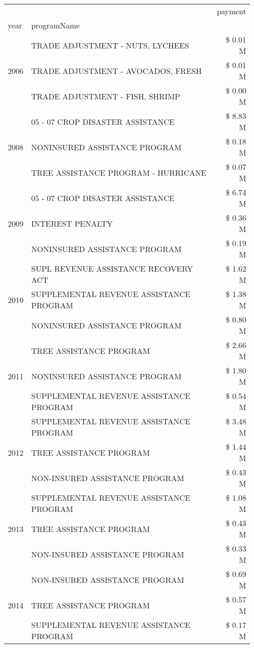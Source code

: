 \begin{tabular}{llr}
\toprule
 &  & payment \\
year & programName &  \\
\midrule
\multirow[t]{3}{*}{2006} & TRADE ADJUSTMENT - NUTS, LYCHEES & \$ 0.01 M \\
 & TRADE ADJUSTMENT - AVOCADOS, FRESH & \$ 0.01 M \\
 & TRADE ADJUSTMENT - FISH, SHRIMP & \$ 0.00 M \\
\cline{1-3}
\multirow[t]{3}{*}{2008} & 05 - 07 CROP DISASTER ASSISTANCE & \$ 8.83 M \\
 & NONINSURED ASSISTANCE PROGRAM & \$ 0.18 M \\
 & TREE ASSISTANCE PROGRAM - HURRICANE & \$ 0.07 M \\
\cline{1-3}
\multirow[t]{3}{*}{2009} & 05 - 07 CROP DISASTER ASSISTANCE & \$ 6.74 M \\
 & INTEREST PENALTY & \$ 0.36 M \\
 & NONINSURED ASSISTANCE PROGRAM & \$ 0.19 M \\
\cline{1-3}
\multirow[t]{3}{*}{2010} & SUPL REVENUE ASSISTANCE RECOVERY ACT & \$ 1.62 M \\
 & SUPPLEMENTAL REVENUE ASSISTANCE PROGRAM & \$ 1.38 M \\
 & NONINSURED ASSISTANCE PROGRAM & \$ 0.80 M \\
\cline{1-3}
\multirow[t]{3}{*}{2011} & TREE ASSISTANCE PROGRAM & \$ 2.66 M \\
 & NONINSURED ASSISTANCE PROGRAM & \$ 1.80 M \\
 & SUPPLEMENTAL REVENUE ASSISTANCE PROGRAM & \$ 0.54 M \\
\cline{1-3}
\multirow[t]{3}{*}{2012} & SUPPLEMENTAL REVENUE ASSISTANCE PROGRAM & \$ 3.48 M \\
 & TREE ASSISTANCE PROGRAM & \$ 1.44 M \\
 & NON-INSURED ASSISTANCE PROGRAM & \$ 0.43 M \\
\cline{1-3}
\multirow[t]{3}{*}{2013} & SUPPLEMENTAL REVENUE ASSISTANCE PROGRAM & \$ 1.08 M \\
 & TREE ASSISTANCE PROGRAM & \$ 0.43 M \\
 & NON-INSURED ASSISTANCE PROGRAM & \$ 0.33 M \\
\cline{1-3}
\multirow[t]{3}{*}{2014} & NON-INSURED ASSISTANCE PROGRAM & \$ 0.69 M \\
 & TREE ASSISTANCE PROGRAM & \$ 0.57 M \\
 & SUPPLEMENTAL REVENUE ASSISTANCE PROGRAM & \$ 0.17 M \\

\end{tabular}

